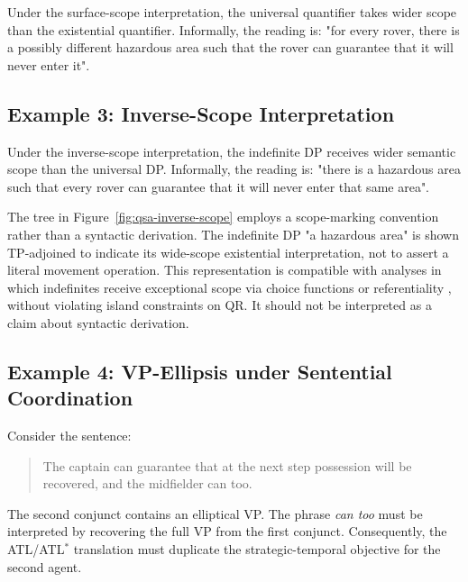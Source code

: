 \documentclass[letterpaper]{article}
\begin{document}
\begin{example}
Under the surface-scope interpretation, the universal quantifier takes wider scope than the existential quantifier. Informally, the reading is: "for every rover, there is a possibly different hazardous area such that the rover can guarantee that it will never enter it".
\end{example}


\subsection{Example 3: Inverse-Scope Interpretation}

\begin{example}
Under the inverse-scope interpretation, the indefinite DP receives wider semantic scope than the universal DP. Informally, the reading is: "there is a hazardous area such that every rover can guarantee that it will never enter that same area".
\end{example}


The tree in Figure~\ref{fig:qsa-inverse-scope} employs a scope-marking convention rather than a syntactic derivation. The indefinite DP "a hazardous area" is shown TP-adjoined to indicate its wide-scope existential interpretation, not to assert a literal movement operation. This representation is compatible with analyses in which indefinites receive exceptional scope via choice functions \cite{reinhart1997quantifier} or referentiality \cite{fodor1982referential}, without violating island constraints on QR. It should not be interpreted as a claim about syntactic derivation.

\subsection{Example 4: VP-Ellipsis under Sentential Coordination}

\begin{example}[VP-ellipsis]
Consider the sentence:
\begin{quote}
The captain can guarantee that at the next step possession will be recovered, and the midfielder can too.
\end{quote}
The second conjunct contains an elliptical VP. The phrase \emph{can too} must be interpreted by recovering the full VP from the first conjunct. Consequently, the ATL/ATL$^\ast$ translation must duplicate the strategic-temporal objective for the second agent.
\end{example}
\end{document}
